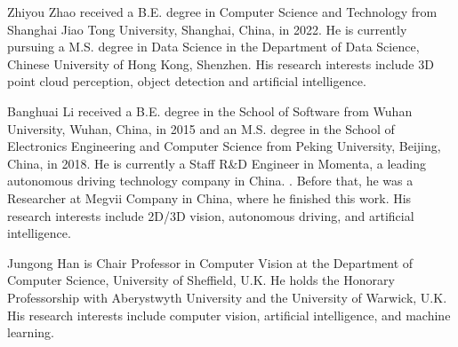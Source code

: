 \documentclass[lettersize,journal]{IEEEtran}
\begin{document}
\begin{IEEEbiographynophoto}{Zhiyou Zhao}
received a B.E. degree in Computer Science and Technology from Shanghai Jiao Tong University, Shanghai, China, in 2022. He is currently pursuing a M.S. degree in Data Science in the Department of Data Science, Chinese University of Hong Kong, Shenzhen. His research interests include 3D point cloud perception, object detection and artificial intelligence.


\end{IEEEbiographynophoto}

\begin{IEEEbiographynophoto}{Banghuai Li}
received a B.E. degree in the School of Software from Wuhan University, Wuhan, China, in 2015 and an M.S. degree in the School of Electronics Engineering and Computer Science from Peking University, Beijing, China, in 2018. He is currently a Staff R\&D Engineer in Momenta, a leading autonomous driving technology company in China. . Before that, he was a Researcher at Megvii Company in China, where he finished this work. His research interests include 2D/3D vision, autonomous driving, and artificial intelligence.
\end{IEEEbiographynophoto}

\begin{IEEEbiographynophoto}{Jungong Han}
is Chair Professor in Computer Vision at the Department of Computer Science, University of Sheffield, U.K. He holds the Honorary Professorship with Aberystwyth University and the University of Warwick, U.K. His research interests include computer vision, artificial intelligence, and machine learning.
\end{IEEEbiographynophoto}
\end{document}
